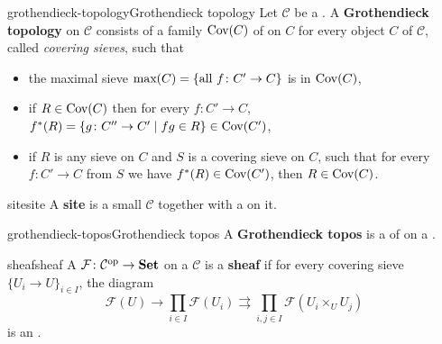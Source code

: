 \begin{topic}{grothendieck-topology}{Grothendieck topology}
    Let $\mathcal{C}$ be a . A \textbf{Grothendieck topology} on $\mathcal{C}$ consists of a family $\textup{Cov}(C)$ of  on $C$ for every object $C$ of $\mathcal{C}$, called \textit{covering sieves}, such that
    \begin{itemize}
        \item the maximal sieve $\textup{max}(C) = \{ \text{all } f \colon C' \to C \}$ is in $\textup{Cov}(C)$,
        \item if $R \in \textup{Cov}(C)$ then for every $f \colon C' \to C$, $f^*(R) = \{ g \colon C'' \to C' \mid fg \in R \} \in \textup{Cov}(C')$,
        \item if $R$ is any sieve on $C$ and $S$ is a covering sieve on $C$, such that for every $f \colon C' \to C$ from $S$ we have $f^*(R) \in \textup{Cov}(C')$, then $R \in \textup{Cov}(C)$.
    \end{itemize}
\end{topic}

\begin{topic}{site}{site}
    A \textbf{site} is a small  $\mathcal{C}$ together with a  on it.
\end{topic}

\begin{topic}{grothendieck-topos}{Grothendieck topos}
    A \textbf{Grothendieck topos} is a  of  on a .
\end{topic}

\begin{topic}{sheaf}{sheaf}
    A  $\mathcal{F} \colon \mathcal{C}^\textup{op} \to \textbf{Set}$ on a  $\mathcal{C}$ is a \textbf{sheaf} if for every covering sieve $\{ U_i \to U \}_{i \in I}$, the diagram
    \[ \mathcal{F}(U) \to \prod_{i \in I} \mathcal{F}(U_i) \rightrightarrows \prod_{i, j \in I} \mathcal{F}(U_i \times_U U_j) \]
    is an .
\end{topic}

